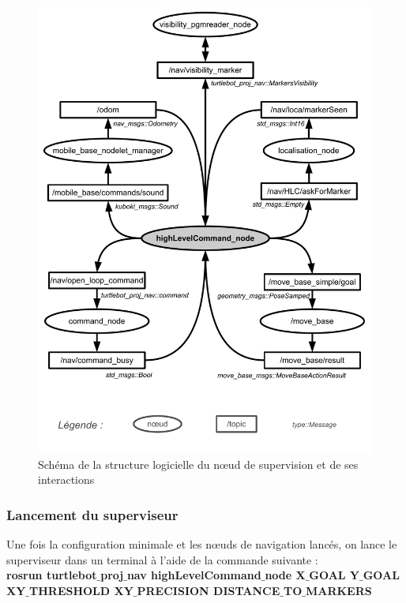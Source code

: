 \documentclass[10pt,a4paper]{article}
\begin{document}
\begin{figure}[!h]
\centering\includegraphics[scale=0.6]{figures/HLC_ROS_struc.pdf}
\caption{Schéma de la structure logicielle du nœud de supervision et de ses interactions }
\label{HLC_ROS_struc}
\end{figure}

\subsubsection{Lancement du superviseur}
\label{sec:LancementDuSuperviseur}

Une fois la configuration minimale et les nœuds de navigation lancés, on lance le superviseur dans un terminal à l'aide de la commande suivante :\\

\textbf{rosrun turtlebot$\_$proj$\_$nav highLevelCommand$\_$node X$\_$GOAL Y$\_$GOAL XY$\_$THRESHOLD XY$\_$PRECISION DISTANCE$\_$TO$\_$MARKERS}\\
\end{document}
